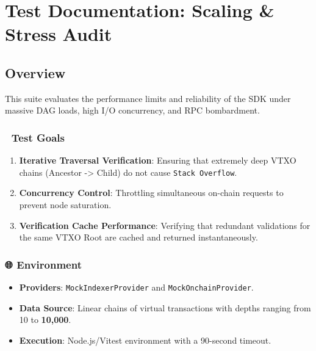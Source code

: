 \documentclass[
]{article}
\author{}
\date{}
\providecommand{\tightlist}{%
  \setlength{\itemsep}{0pt}\setlength{\parskip}{0pt}}
\begin{document}
\hypertarget{test-documentation-scaling-stress-audit}{%
\section{Test Documentation: Scaling \& Stress
Audit}\label{test-documentation-scaling-stress-audit}}

\hypertarget{overview}{%
\subsection{Overview}\label{overview}}

This suite evaluates the performance limits and reliability of the SDK
under massive DAG loads, high I/O concurrency, and RPC bombardment.

\hypertarget{test-goals}{%
\subsubsection{🎯 Test Goals}\label{test-goals}}

\begin{enumerate}
\def\labelenumi{\arabic{enumi}.}
\tightlist
\item
  \textbf{Iterative Traversal Verification}: Ensuring that extremely
  deep VTXO chains (Ancestor -\textgreater{} Child) do not cause
  \texttt{Stack\ Overflow}.
\item
  \textbf{Concurrency Control}: Throttling simultaneous on-chain
  requests to prevent node saturation.
\item
  \textbf{Verification Cache Performance}: Verifying that redundant
  validations for the same VTXO Root are cached and returned
  instantaneously.
\end{enumerate}

\hypertarget{environment}{%
\subsubsection{🌐 Environment}\label{environment}}

\begin{itemize}
\tightlist
\item
  \textbf{Providers}: \texttt{MockIndexerProvider} and
  \texttt{MockOnchainProvider}.
\item
  \textbf{Data Source}: Linear chains of virtual transactions with
  depths ranging from 10 to \textbf{10,000}.
\item
  \textbf{Execution}: Node.js/Vitest environment with a 90-second
  timeout.
\end{itemize}
\end{document}
